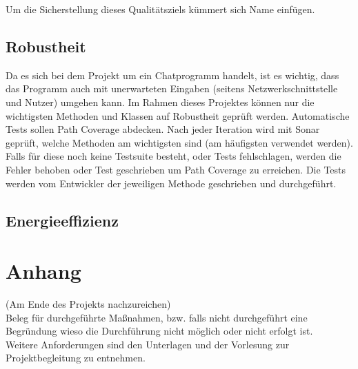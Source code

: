 \documentclass{tudreport}
\begin{document}
        Um die Sicherstellung dieses Qualitätsziels kümmert sich \glqq Name einfügen\grqq.
        

        \section{Robustheit}
        
        Da es sich bei dem Projekt um ein Chatprogramm handelt, ist es wichtig, dass das Programm auch mit unerwarteten Eingaben (seitens Netzwerkschnittstelle und Nutzer) umgehen kann.
        Im Rahmen dieses Projektes können nur die wichtigsten Methoden und Klassen auf Robustheit geprüft werden.
        Automatische Tests sollen Path Coverage abdecken.
        Nach jeder Iteration wird mit Sonar geprüft, welche Methoden am wichtigsten sind (am häufigsten verwendet werden). Falls für diese noch keine Testsuite besteht, oder Tests fehlschlagen, werden die Fehler behoben oder Test geschrieben um Path Coverage zu erreichen.
        Die Tests werden vom Entwickler der jeweiligen Methode geschrieben und durchgeführt.
        

        \section{Energieeffizienz}
        
	        
	
\appendix	
	\chapter{Anhang}
		(Am Ende des Projekts nachzureichen)\\
		Beleg für durchgeführte Maßnahmen, bzw. falls nicht durchgeführt eine Begründung wieso die Durchführung nicht möglich oder nicht erfolgt ist. \\
		Weitere Anforderungen sind den Unterlagen und der Vorlesung zur Projektbegleitung zu entnehmen.
	
\end{document}
